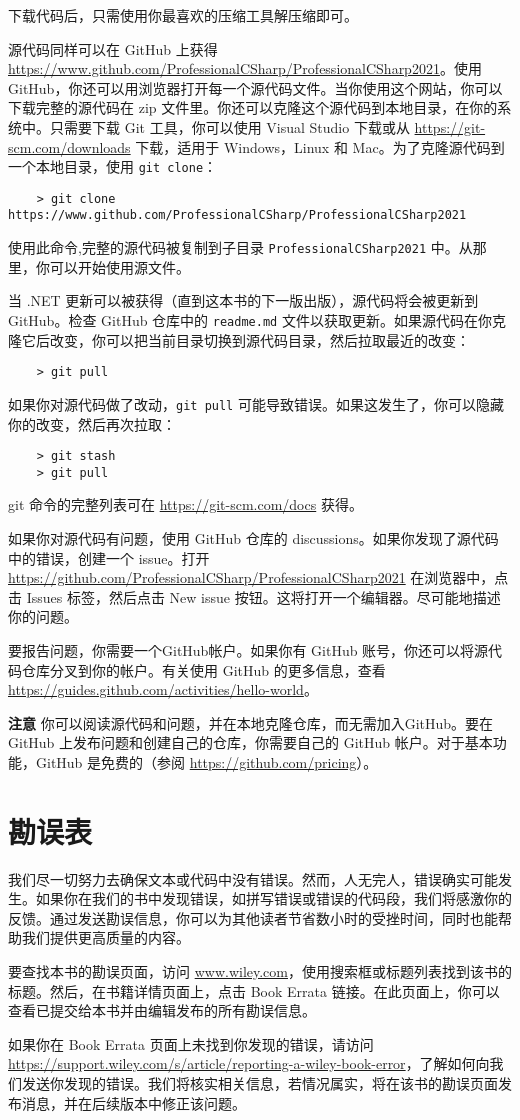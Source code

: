 下载代码后，只需使用你最喜欢的压缩工具解压缩即可。

源代码同样可以在 GitHub 上获得 \url{https://www.github.com/ProfessionalCSharp/ProfessionalCSharp2021}。使用 GitHub，你还可以用浏览器打开每一个源代码文件。当你使用这个网站，你可以下载完整的源代码在 zip 文件里。你还可以克隆这个源代码到本地目录，在你的系统中。只需要下载 Git 工具，你可以使用 Visual Studio 下载或从 \url{https://git-scm.com/downloads} 下载，适用于 Windows，Linux 和 Mac。为了克隆源代码到一个本地目录，使用 \verb|git clone|：
\begin{verbatim}
    > git clone https://www.github.com/ProfessionalCSharp/ProfessionalCSharp2021
\end{verbatim}
使用此命令,完整的源代码被复制到子目录 \verb|ProfessionalCSharp2021| 中。从那里，你可以开始使用源文件。

当 .NET 更新可以被获得（直到这本书的下一版出版），源代码将会被更新到 GitHub。检查 GitHub 仓库中的 \verb|readme.md| 文件以获取更新。如果源代码在你克隆它后改变，你可以把当前目录切换到源代码目录，然后拉取最近的改变：
\begin{verbatim}
    > git pull
\end{verbatim}
如果你对源代码做了改动，\verb|git pull| 可能导致错误。如果这发生了，你可以隐藏你的改变，然后再次拉取：
\begin{verbatim}
    > git stash
    > git pull
\end{verbatim}
git 命令的完整列表可在 \url{https://git-scm.com/docs} 获得。

如果你对源代码有问题，使用 GitHub 仓库的 discussions。如果你发现了源代码中的错误，创建一个 issue。打开 \url{https://github.com/ProfessionalCSharp/ProfessionalCSharp2021} 在浏览器中，点击 Issues 标签，然后点击 New issue 按钮。这将打开一个编辑器。尽可能地描述你的问题。

要报告问题，你需要一个GitHub帐户。如果你有 GitHub 账号，你还可以将源代码仓库分叉到你的帐户。有关使用 GitHub 的更多信息，查看 \url{https://guides.github.com/activities/hello-world}。
\begin{framed}
    \textbf{注意} 你可以阅读源代码和问题，并在本地克隆仓库，而无需加入GitHub。要在 GitHub 上发布问题和创建自己的仓库，你需要自己的 GitHub 帐户。对于基本功能，GitHub 是免费的（参阅 \url{https://github.com/pricing}）。
\end{framed}

\section*{勘误表}
我们尽一切努力去确保文本或代码中没有错误。然而，人无完人，错误确实可能发生。如果你在我们的书中发现错误，如拼写错误或错误的代码段，我们将感激你的反馈。通过发送勘误信息，你可以为其他读者节省数小时的受挫时间，同时也能帮助我们提供更高质量的内容。

要查找本书的勘误页面，访问 \url{www.wiley.com}，使用搜索框或标题列表找到该书的标题。然后，在书籍详情页面上，点击 Book Errata 链接。在此页面上，你可以查看已提交给本书并由编辑发布的所有勘误信息。

如果你在 Book Errata 页面上未找到你发现的错误，请访问 \url{https://support.wiley.com/s/article/reporting-a-wiley-book-error}，了解如何向我们发送你发现的错误。我们将核实相关信息，若情况属实，将在该书的勘误页面发布消息，并在后续版本中修正该问题。